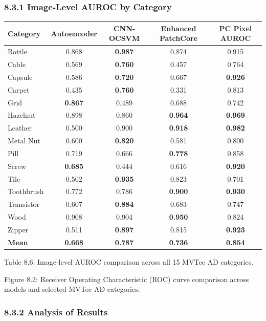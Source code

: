 \documentclass[12pt, a4paper, oneside]{report}
\begin{document}
\subsubsection{8.3.1 Image-Level AUROC by Category}\label{image-level-auroc-by-category}

{\def\LTcaptype{none} %
\begin{longtable}[]{@{}lcccc@{}}
\toprule\noalign{}
Category & Autoencoder & CNN-OCSVM & \textbf{Enhanced PatchCore} & PC Pixel AUROC \\
\midrule\noalign{}
\endhead
\bottomrule\noalign{}
\endlastfoot
Bottle & 0.868 & \textbf{0.987} & 0.874 & 0.915 \\
Cable & 0.569 & \textbf{0.760} & 0.457 & 0.764 \\
Capsule & 0.586 & \textbf{0.720} & 0.667 & \textbf{0.926} \\
Carpet & 0.435 & \textbf{0.760} & 0.331 & 0.813 \\
Grid & \textbf{0.867} & 0.489 & 0.688 & 0.742 \\
Hazelnut & 0.898 & 0.860 & \textbf{0.964} & \textbf{0.969} \\
Leather & 0.500 & 0.900 & \textbf{0.918} & \textbf{0.982} \\
Metal Nut & 0.600 & \textbf{0.820} & 0.581 & 0.800 \\
Pill & 0.719 & 0.666 & \textbf{0.778} & 0.858 \\
Screw & \textbf{0.685} & 0.444 & 0.616 & \textbf{0.920} \\
Tile & 0.502 & \textbf{0.935} & 0.823 & 0.701 \\
Toothbrush & 0.772 & 0.786 & \textbf{0.900} & \textbf{0.930} \\
Transistor & 0.607 & \textbf{0.884} & 0.683 & 0.747 \\
Wood & 0.908 & 0.904 & \textbf{0.950} & 0.824 \\
Zipper & 0.511 & \textbf{0.897} & 0.815 & \textbf{0.923} \\
\textbf{Mean} & \textbf{0.668} & \textbf{0.787} & \textbf{0.736} & \textbf{0.854} \\
\end{longtable}
}

Table 8.6: Image-level AUROC comparison across all 15 MVTec AD categories.

Figure 8.2: Receiver Operating Characteristic (ROC) curve comparison across models and selected MVTec AD categories.

\subsubsection{8.3.2 Analysis of Results}\label{analysis-of-results}
\end{document}
